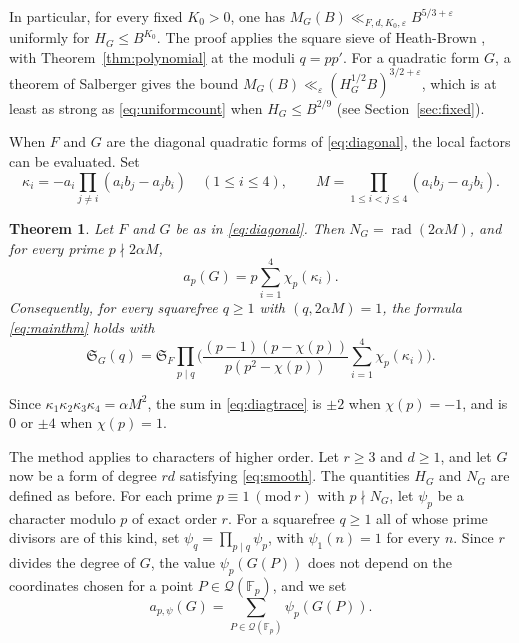 \documentclass[11pt]{amsart}
\numberwithin{equation}{section}
\numberwithin{figure}{section}
\newtheorem{theorem}{Theorem}[section]
\theoremstyle{definition}
\newcommand{\imod}[1]{\ (\mathrm{mod}\ #1)}
\renewcommand{\S}{\mathfrak{S}}
\newcommand{\eps}{\varepsilon}
\newcommand{\Fp}{\mathbb F_p}
\newcommand{\Qc}{\mathcal Q}
\newcommand{\rad}{\operatorname{rad}}
\begin{document}
In particular, for every fixed $K_0>0$, one has
$M_G(B)\ll_{F,d,K_0,\eps}B^{5/3+\eps}$ uniformly for $H_G\le B^{K_0}$. The
proof applies the square sieve of Heath-Brown \cite{HB2}, with
Theorem~\ref{thm:polynomial} at the moduli $q=pp'$. For a quadratic
form $G$, a theorem of Salberger \cite{S} gives the bound
$M_G(B)\ll_\eps(H_G^{1/2}B)^{3/2+\eps}$, which is at least as strong
as \eqref{eq:uniformcount} when $H_G\le B^{2/9}$ (see
Section~\ref{sec:fixed}).

When $F$ and $G$ are the diagonal quadratic forms of
\eqref{eq:diagonal}, the local factors can be evaluated. Set
\begin{equation}\label{eq:kappadef}
 \kappa_i=-a_i\prod_{j\ne i}(a_ib_j-a_jb_i)\quad(1\le i\le4),
 \qquad M=\prod_{1\le i<j\le4}(a_ib_j-a_jb_i).
\end{equation}

\begin{theorem}\label{thm:diagonal}
Let $F$ and $G$ be as in \eqref{eq:diagonal}. Then
$N_G=\rad(2\alpha M)$, and for every prime $p\nmid2\alpha M$,
\begin{equation}\label{eq:diagtrace}
 a_p(G)=p\sum_{i=1}^4\chi_p(\kappa_i).
\end{equation}
Consequently, for every squarefree $q\ge1$ with $(q,2\alpha M)=1$,
the formula \eqref{eq:mainthm} holds with
\begin{equation}\label{eq:diagmain}
 \S_G(q)=\S_F\prod_{p\mid q}\bigg(\frac{(p-1)(p-\chi(p))}{p(p^2-\chi(p))}
 \sum_{i=1}^4\chi_p(\kappa_i)\bigg).
\end{equation}
\end{theorem}

Since $\kappa_1\kappa_2\kappa_3\kappa_4=\alpha M^2$, the sum in
\eqref{eq:diagtrace} is $\pm2$ when $\chi(p)=-1$, and is $0$ or
$\pm4$ when $\chi(p)=1$.

The method applies to characters of higher order. Let $r\ge3$ and
$d\ge1$, and let $G$ now be a form of degree $rd$ satisfying
\eqref{eq:smooth}. The quantities $H_G$ and $N_G$ are defined as
before. For each prime $p\equiv1\imod r$ with $p\nmid N_G$, let
$\psi_p$ be a character modulo $p$ of exact order $r$. For a
squarefree $q\ge1$ all of whose prime divisors are of this kind, set
$\psi_q=\prod_{p\mid q}\psi_p$, with $\psi_1(n)=1$ for every $n$.
Since $r$ divides the degree of $G$, the value $\psi_p(G(P))$ does not
depend on the coordinates chosen for a point $P\in\Qc(\Fp)$, and we
set
\begin{equation}\label{eq:apsidef}
 a_{p,\psi}(G)=\sum_{P\in\Qc(\Fp)}\psi_p(G(P)).
\end{equation}
\end{document}
